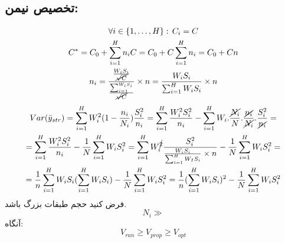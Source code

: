 \begin{enumerate}
		\subsection*{تخصیص نیمن:}
		\begin{gather*}
			\forall i \in \{1,\dots,H\}:\, C_i=C \\
			C^*=C_0+\sum_{i=1}^{H}n_i C=C_0+C\sum_{i=1}^{H}n_i=C_0+Cn \\
			n_i=\frac{\frac{W_iS_i}{\cancel{\sqrt{C}}}}
			{\frac{\sum_{i=1}^{W_iS_i}}{\cancel{\sqrt{C}}}}\times n
			=
			\frac{W_iS_i}{\sum_{i=1}^{H}W_iS_i}\times n
		\end{gather*}
		\begin{multline*}
			Var(\bar{y}_{str})=\sum_{i=1}^{H}W_i^2(1-\frac{n_i}{N_i})\frac{S_i^2}{n_i}=
			\sum_{i=1}^{H}\frac{W_i^2S_i^2}{n_i}-
			\sum_{i=1}^{H}W_i.\frac{\cancel{N_i}}{N}.\frac{\cancel{n_i}}{\cancel{N_i}}.\frac{S_i^2}{\cancel{n_i}}
			=\\=
			\sum_{i=1}^{H}\frac{W_i^2S_i^2}{n_i}-\frac{1}{N}\sum_{i=1}^{H}W_iS_i^2
			=\sum_{i=1}^{H}W_i^{\cancel{2}}\frac{S_i^2}{\frac{W_iS_i}{\sum_{i=1}^{H}W_IS_i}\times n}
			-\frac{1}{N}\sum_{i=1}^{H}W_iS_i^2
			=\\=
			\frac{1}{n}\sum_{i=1}^{H}W_iS_i(\sum_{i=1}^{H}W_iS_i)-\frac{1}{N}\sum_{i=1}^{H}W_iS_i^2
			=\frac{1}{n}(\sum_{i=1}^{H}W_iS_i)^2-\frac{1}{N}\sum_{i=1}^{H}W_iS_i^2
		\end{multline*}
		فرض کنید حجم طبقات بزرگ باشد.
		\begin{equation*}
			N_i \gg 
		\end{equation*}
		آنگاه:
		\begin{equation*}
			V_{ran}\geq V_{prop} \geq V_{opt}
		\end{equation*}
\end{enumerate}
